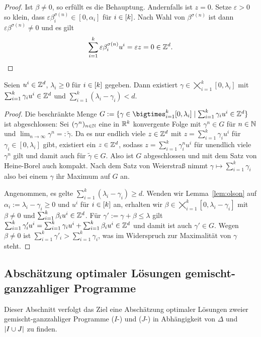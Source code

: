 \begin{proof}
	Ist $\beta\neq0$, so erfüllt es die Behauptung.
	Andernfalls ist $z=0$.
	Setze $\varepsilon>0$ so klein, dass $\varepsilon\beta^{\sigma(n)}_i\in[0,\alpha_i]$ für $i\in[k]$.
	Nach Wahl von $\beta^{\sigma(n)}$ ist dann $\varepsilon\beta^{\sigma(n)}\neq0$ und es gilt $$\sum_{i=1}^k\varepsilon\beta^{\sigma(n)}_iu^i=\varepsilon z=0\in\mathbb{Z}^d.$$
\end{proof}

\begin{lemma}\label{lem:maxgamma}
	Seien $u^i\in\mathbb{Z}^d$, $\lambda_i\geq0$ für $i\in[k]$ gegeben.
	Dann existiert $\gamma\in\bigtimes_{i=1}^k [0,\lambda_i]$ mit $\sum_{i=1}^k \gamma_i u^i\in\mathbb{Z}^d$ und  $\sum_{i=1}^k(\lambda_i-\gamma_i)<d$.
\end{lemma}
\begin{proof}
	Die beschränkte Menge $G:=\{\gamma \in \bigtimes_{i=1}^k [0,\lambda_i] \mid \sum_{i=1}^k \gamma_i u^i\in\Z^d \}$ ist abgeschlossen: Sei $(\gamma^n)_{n\in\mathbb{N}}$ eine in $\mathbb{R}^k$ konvergente Folge mit $\gamma^n\in G$ für $n\in\mathbb{N}$ und $\lim_{n\to\infty}\gamma^n=:\tilde{\gamma}$.
	Da es nur endlich viele $z\in\mathbb{Z}^d$ mit $z=\sum_{i=1}^k\gamma_iu^i$ für $\gamma_i\in[0,\lambda_i]$ gibt, existiert ein $z\in\mathbb{Z}^d$, sodass $z=\sum_{i=1}^k\gamma^n_iu^i$ für unendlich viele $\gamma^n$ gilt und damit auch für $\tilde{\gamma}\in G$.
	Also ist $G$ abgeschlossen und mit dem Satz von Heine-Borel auch kompakt.
	Nach dem Satz von Weierstraß nimmt $\gamma \mapsto \sum_{i=1}^k\gamma_i$ also bei einem $\gamma$ ihr Maximum auf $G$ an.
	
	Angenommen, es gelte $\sum_{i=1}^k(\lambda_i - \gamma_i) \geq d$.
	Wenden wir Lemma~\ref{lem:olson} auf $\alpha_i:=\lambda_i-\gamma_i\geq0$ und $u^i$ für $i\in[k]$ an, erhalten wir $\beta\in\bigtimes_{i=1}^k[0,\lambda_i-\gamma_i]$ mit $\beta\neq0$ und $\sum_{i=1}^k \beta_i u^i\in\mathbb{Z}^d$.
	Für $\gamma':=\gamma+\beta\leq\lambda$ gilt 
	$
	\sum_{i=1}^k\gamma'_iu^i = \sum_{i=1}^k\gamma_iu^i + \sum_{i=1}^k \beta_iu^i\in\mathbb{Z}^d
	$
	und damit ist auch $\gamma'\in G$.
	Wegen $\beta\neq0$ ist $\sum_{i=1}^k\gamma'_i > \sum_{i=1}^k\gamma_i$, was im Widerspruch zur Maximalität von $\gamma$ steht.
\end{proof}

\subsection{Abschätzung optimaler Lösungen gemischt-ganzzahliger Programme}
Dieser Abschnitt verfolgt das Ziel eine Abschätzung optimaler Lösungen zweier gemischt-ganzzahliger Programme	($I$-\MIPR) und ($J$-\MIPR) in Abhängigkeit von $\Delta$ und $\lvert I\cup J \rvert$ zu finden.

